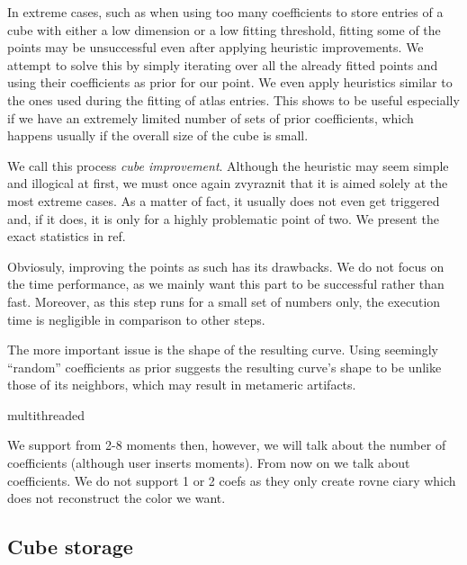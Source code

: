 In extreme cases, such as when using too many coefficients to store entries of a cube with either a low dimension or a low fitting threshold, fitting some of the points may be unsuccessful even after applying heuristic improvements. We attempt to solve this by simply iterating over all the already fitted points and using their coefficients as prior for our point. We even apply heuristics similar to the ones used during the fitting of atlas entries. This shows to be useful especially if we have an extremely limited number of sets of prior coefficients, which happens usually if the overall size of the cube is small.

We call this process \emph{cube improvement}. Although the heuristic may seem simple and illogical at first, we must once again zvyraznit that it is aimed solely at the most extreme cases. As a matter of fact, it usually does not even get triggered and, if it does, it is only for a highly problematic point of two. We present the exact statistics in ref.

Obviosuly, improving the points as such has its drawbacks. We do not focus on the time performance, as we mainly want this part to be successful rather than fast. Moreover, as this step runs for a small set of numbers only, the execution time is negligible in comparison to other steps.

The more important issue is the shape of the resulting curve. Using seemingly ``random'' coefficients as prior suggests the resulting curve's shape to be unlike those of its neighbors, which may result in metameric artifacts.


multithreaded 

We support from 2-8 moments then, however, we will talk about the number of coefficients (although user inserts moments). From now on we talk about coefficients. We do not support 1 or 2 coefs as they only create rovne ciary which does not reconstruct the color we want.

\subsection{Cube storage}
	
